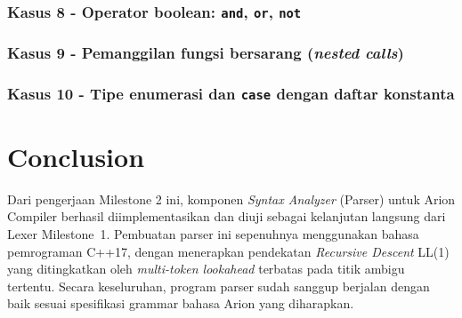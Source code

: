 \documentclass[11pt,a4paper]{article}
\begin{document}
\subsubsection*{Kasus 8 - Operator boolean: \texttt{and}, \texttt{or}, \texttt{not}}





\subsubsection*{Kasus 9 - Pemanggilan fungsi bersarang (\textit{nested calls})}





\subsubsection*{Kasus 10 - Tipe enumerasi dan \texttt{case} dengan daftar konstanta}





\newpage
\section{Conclusion}

Dari pengerjaan Milestone 2 ini, komponen \textit{Syntax Analyzer} (Parser) untuk
Arion Compiler berhasil diimplementasikan dan diuji sebagai kelanjutan langsung
dari Lexer Milestone~1. Pembuatan parser ini sepenuhnya menggunakan bahasa
pemrograman C++17, dengan menerapkan pendekatan \textit{Recursive Descent}
LL(1) yang ditingkatkan oleh \textit{multi-token lookahead} terbatas pada titik
ambigu tertentu. Secara keseluruhan, program parser sudah sanggup berjalan dengan
baik sesuai spesifikasi grammar bahasa Arion yang diharapkan.
\end{document}
